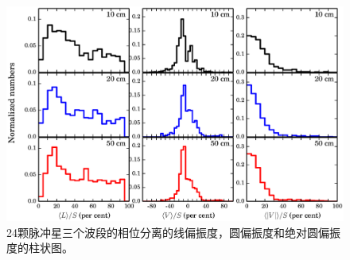 \begin{figure}
\begin{center}
\includegraphics[width=5.5 in]{polHist.ps}
\caption{24颗脉冲星三个波段的相位分离的线偏振度，圆偏振度和绝对圆偏振度的柱状图。}
\label{polHist}
\end{center}
\end{figure}

